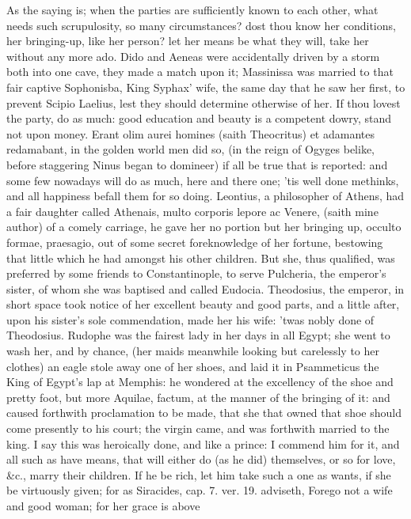 {As the saying is; when the parties are sufficiently known to each
other, what needs such scrupulosity, so many circumstances? dost thou
know her conditions, her bringing-up, like her person? let her means be
what they will, take her without any more ado. Dido and Aeneas
were accidentally driven by a storm both into one cave, they made a
match upon it; Massinissa was married to that fair captive Sophonisba,
King Syphax' wife, the same day that he saw her first, to prevent
Scipio Laelius, lest they should determine otherwise of her. If thou
lovest the party, do as much: good education and beauty is a competent
dowry, stand not upon money. Erant olim aurei homines (saith
Theocritus) et adamantes redamabant, in the golden world men did so,
(in the reign of Ogyges belike, before staggering Ninus began to
domineer) if all be true that is reported: and some few nowadays will
do as much, here and there one; 'tis well done methinks, and all
happiness befall them for so doing. Leontius, a philosopher of
Athens, had a fair daughter called Athenais, multo corporis lepore ac
Venere, (saith mine author) of a comely carriage, he gave her no
portion but her bringing up, occulto formae, praesagio, out of some
secret foreknowledge of her fortune, bestowing that little which he had
amongst his other children. But she, thus qualified, was preferred by
some friends to Constantinople, to serve Pulcheria, the emperor's
sister, of whom she was baptised and called Eudocia. Theodosius, the
emperor, in short space took notice of her excellent beauty and good
parts, and a little after, upon his sister's sole commendation, made
her his wife: 'twas nobly done of Theodosius. Rudophe was the
fairest lady in her days in all Egypt; she went to wash her, and by
chance, (her maids meanwhile looking but carelessly to her clothes) an
eagle stole away one of her shoes, and laid it in Psammeticus the King
of Egypt's lap at Memphis: he wondered at the excellency of the shoe
and pretty foot, but more Aquilae, factum, at the manner of the
bringing of it: and caused forthwith proclamation to be made, that she
that owned that shoe should come presently to his court; the virgin
came, and was forthwith married to the king. I say this was heroically
done, and like a prince: I commend him for it, and all such as have
means, that will either do (as he did) themselves, or so for love, \&c.,
marry their children. If he be rich, let him take such a one as wants,
if she be virtuously given; for as Siracides, cap. 7. ver. 19.
adviseth, Forego not a wife and good woman; for her grace is above
}
